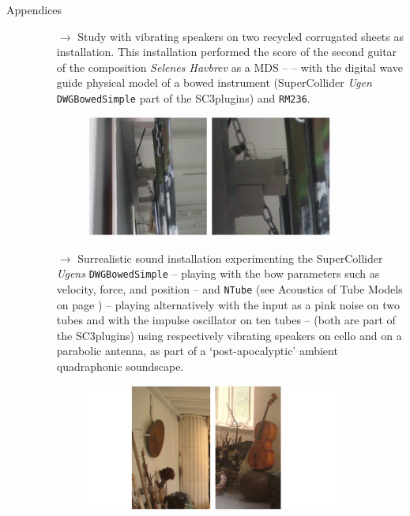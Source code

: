 \begin{description}
\item[Appendices] \hfill 
\begin{itemize}
\item[$\rightarrow$] Study with vibrating speakers on two recycled corrugated sheets as installation. This installation performed the score of the second guitar of the composition \textsl{Selenes Havbrev} as a MDS -- \textsl{} -- with the digital wave guide physical model of a bowed instrument (SuperCollider \textsl{Ugen} \texttt{DWGBowedSimple} part of the SC3plugins) and \texttt{RM236}.\\
\vspace{-4mm}
\begin{figure}[H]
\hfill \includegraphics[width=0.85\textwidth]{mp/img/vs1a}
\end{figure}

\item[$\rightarrow$] Surrealistic sound installation experimenting the SuperCollider \textsl{Ugens} \texttt{DWGBowedSimple} -- playing with the bow parameters such as velocity, force, and position --  and \texttt{NTube} (see Acoustics of Tube Models on page \pageref{atm}) -- playing alternatively with the input as a pink noise on two tubes and with the impulse oscillator on ten tubes -- (both are part of the SC3plugins) using respectively vibrating speakers on cello and on a parabolic antenna, as part of a `post-apocalyptic' ambient quadraphonic soundscape.\\
\vspace{-4mm}
\begin{figure}[H]
\hfill \includegraphics[width=0.87\textwidth]{mp/img/asc}
\end{figure}

\end{itemize}
\end{description}
\vspace{-4mm}


